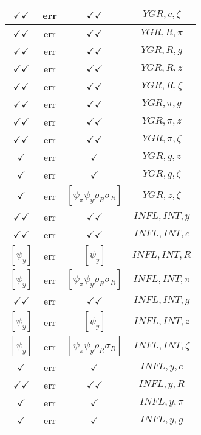 \documentclass[a4paper,10pt]{article}
\begin{document}
\begin{longtable}{|c|c|c|c|}
\hline
$\checkmark\checkmark$ & err & $\checkmark\checkmark$ & ${YGR},{c},{\zeta}$ \\
\hline
$\checkmark\checkmark$ & err & $\checkmark\checkmark$ & ${YGR},{R},{\pi}$ \\
\hline
$\checkmark\checkmark$ & err & $\checkmark\checkmark$ & ${YGR},{R},{g}$ \\
\hline
$\checkmark\checkmark$ & err & $\checkmark\checkmark$ & ${YGR},{R},{z}$ \\
\hline
$\checkmark\checkmark$ & err & $\checkmark\checkmark$ & ${YGR},{R},{\zeta}$ \\
\hline
$\checkmark\checkmark$ & err & $\checkmark\checkmark$ & ${YGR},{\pi},{g}$ \\
\hline
$\checkmark\checkmark$ & err & $\checkmark\checkmark$ & ${YGR},{\pi},{z}$ \\
\hline
$\checkmark\checkmark$ & err & $\checkmark\checkmark$ & ${YGR},{\pi},{\zeta}$ \\
\hline
$\checkmark$ & err & $\checkmark$ & ${YGR},{g},{z}$ \\
\hline
$\checkmark$ & err & $\checkmark$ & ${YGR},{g},{\zeta}$ \\
\hline
$\checkmark$ & err & $[\psi_\pi \psi_y \rho_R \sigma_R ]$ & ${YGR},{z},{\zeta}$ \\
\hline
$\checkmark\checkmark$ & err & $\checkmark\checkmark$ & ${INFL},{INT},{y}$ \\
\hline
$\checkmark\checkmark$ & err & $\checkmark\checkmark$ & ${INFL},{INT},{c}$ \\
\hline
$[\psi_y ]$ & err & $[\psi_y ]$ & ${INFL},{INT},{R}$ \\
\hline
$[\psi_y ]$ & err & $[\psi_\pi \psi_y \rho_R \sigma_R ]$ & ${INFL},{INT},{\pi}$ \\
\hline
$\checkmark\checkmark$ & err & $\checkmark\checkmark$ & ${INFL},{INT},{g}$ \\
\hline
$[\psi_y ]$ & err & $[\psi_y ]$ & ${INFL},{INT},{z}$ \\
\hline
$[\psi_y ]$ & err & $[\psi_\pi \psi_y \rho_R \sigma_R ]$ & ${INFL},{INT},{\zeta}$ \\
\hline
$\checkmark$ & err & $\checkmark$ & ${INFL},{y},{c}$ \\
\hline
$\checkmark\checkmark$ & err & $\checkmark\checkmark$ & ${INFL},{y},{R}$ \\
\hline
$\checkmark$ & err & $\checkmark$ & ${INFL},{y},{\pi}$ \\
\hline
$\checkmark$ & err & $\checkmark$ & ${INFL},{y},{g}$ \\

\end{longtable}
\end{document}
